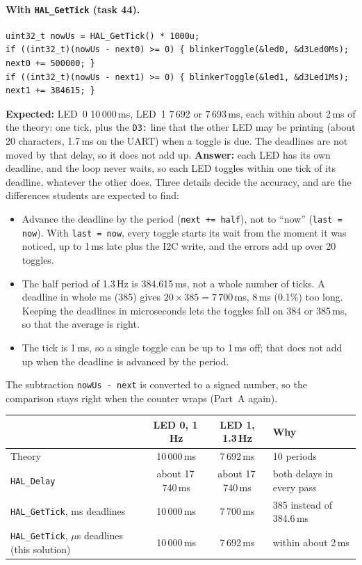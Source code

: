 \documentclass[11pt,a4paper]{article}
\begin{document}
\paragraph{With \texttt{HAL\_GetTick} (task 44).}
\begin{lstlisting}
uint32_t nowUs = HAL_GetTick() * 1000u;
if ((int32_t)(nowUs - next0) >= 0) { blinkerToggle(&led0, &d3Led0Ms); next0 += 500000; }
if ((int32_t)(nowUs - next1) >= 0) { blinkerToggle(&led1, &d3Led1Ms); next1 += 384615; }
\end{lstlisting}
\textbf{Expected:} LED~0 10\,000\,ms, LED~1 7\,692 or 7\,693\,ms, each within about 2\,ms of the theory: one tick,
plus the \texttt{D3:} line that the other LED may be printing (about 20 characters, 1.7\,ms on the UART) when a
toggle is due. The deadlines are not moved by that delay, so it does not add up.
\textbf{Answer:} each LED has its own deadline, and the loop never waits, so each LED toggles within one tick of its
deadline, whatever the other does. Three details decide the accuracy, and are the differences students are expected
to find:
\begin{itemize}
  \item Advance the deadline by the period (\texttt{next += half}), not to ``now'' (\texttt{last = now}). With
        \texttt{last = now}, every toggle starts its wait from the moment it was noticed, up to 1\,ms late plus the
        I2C write, and the errors add up over 20 toggles.
  \item The half period of 1.3\,Hz is 384.615\,ms, not a whole number of ticks. A deadline in whole ms (385) gives
        $20 \times 385 = 7\,700$\,ms, 8\,ms (0.1\%) too long. Keeping the deadlines in microseconds lets the toggles
        fall on 384 or 385\,ms, so that the average is right.
  \item The tick is 1\,ms, so a single toggle can be up to 1\,ms off; that does not add up when the deadline is
        advanced by the period.
\end{itemize}
The subtraction \texttt{nowUs - next} is converted to a signed number, so the comparison stays right when the counter
wraps (Part~A again).

\smallskip\noindent
\begin{tabularx}{\textwidth}{@{}l c c L@{}}
\toprule
 & LED 0, 1\,Hz & LED 1, 1.3\,Hz & Why \\
\midrule
Theory & 10\,000\,ms & 7\,692\,ms & 10 periods \\
\texttt{HAL\_Delay} & about 17\,740\,ms & about 17\,740\,ms & both delays in every pass \\
\texttt{HAL\_GetTick}, ms deadlines & 10\,000\,ms & 7\,700\,ms & 385 instead of 384.6\,ms \\
\texttt{HAL\_GetTick}, $\mu$s deadlines (this solution) & 10\,000\,ms & 7\,692\,ms & within about 2\,ms \\
\bottomrule
\end{tabularx}
\end{document}
